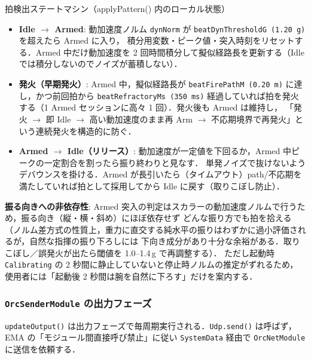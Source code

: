 \documentclass[lualatex,book,paper=a4paper,jafontsize=11.5pt,jafontscale=1.05]{jlreq}
\begin{document}
\begin{apibox}{拍検出ステートマシン（applyPattern() 内のローカル状態）}
\begin{itemize}\setlength{\itemsep}{2pt}
  \item \textbf{Idle $\to$ Armed}: 動加速度ノルム \texttt{dynNorm} が \texttt{beatDynThresholdG (1.20\,g)} を超えたら Armed に入り，
        積分用変数・ピーク値・突入時刻をリセットする．Armed 中だけ動加速度を 2 回時間積分して擬似経路長を更新する（Idle では積分しないのでノイズが蓄積しない）．
  \item \textbf{発火（早期発火）}: Armed 中，擬似経路長が \texttt{beatFirePathM (0.20\,m)} に達し，かつ前回拍から
        \texttt{beatRefractoryMs (350\,ms)} 経過していれば拍を発火する（1 Armed セッションに高々 1 回）．発火後も Armed は維持し，
        「発火 $\to$ 即 Idle $\to$ 高い動加速度のまま再 Arm $\to$ 不応期境界で再発火」という連続発火を構造的に防ぐ．
  \item \textbf{Armed $\to$ Idle（リリース）}: 動加速度が一定値を下回るか，Armed 中ピークの一定割合を割ったら振り終わりと見なす．
        単発ノイズで抜けないようデバウンスを掛ける．Armed が長引いたら（タイムアウト）path/不応期を満たしていれば拍として採用してから Idle に戻す（取りこぼし防止）．
\end{itemize}
\end{apibox}

\textbf{振る向きへの非依存性}: Armed 突入の判定はスカラーの動加速度ノルムで行うため，振る向き（縦・横・斜め）にほぼ依存せず
どんな振り方でも拍を拾える（ノルム差方式の性質上，重力に直交する純水平の振りはわずかに過小評価されるが，自然な指揮の振り下ろしには
下向き成分があり十分な余裕がある．取りこぼし／誤発火が出たら閾値を 1.0--1.4\,g で再調整する）．
ただし起動時 \texttt{Calibrating} の 2 秒間に静止していないと停止時ノルムの推定がずれるため，使用者には「起動後 2 秒間は腕を自然に下ろす」だけを案内する．

\subsubsection{\texttt{OrcSenderModule} の出力フェーズ}

\texttt{updateOutput()} は出力フェーズで毎周期実行される．\texttt{Udp.send()} は呼ばず，
EMA の「モジュール間直接呼び禁止」に従い \texttt{SystemData} 経由で
\texttt{OrcNetModule} に送信を依頼する．
\end{document}
